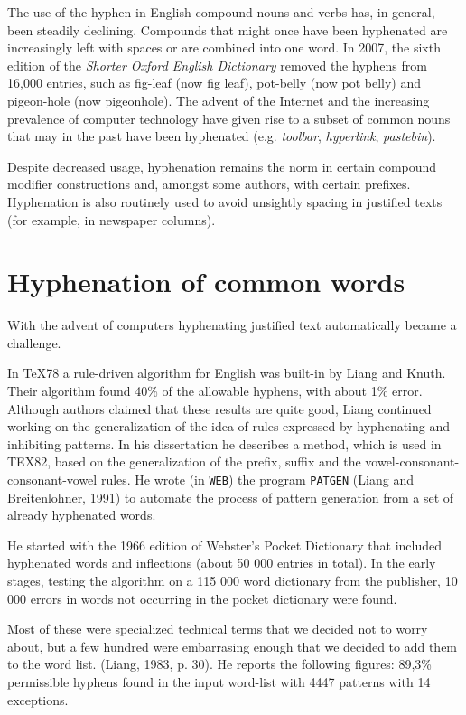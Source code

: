 The use of the hyphen in English compound nouns and verbs has, in general, been steadily declining. Compounds that might once have been hyphenated are increasingly left with spaces or are combined into one word. In 2007, the sixth edition of the \textit{Shorter Oxford English Dictionary} removed the hyphens from 16,000 entries, such as fig-leaf (now fig leaf), pot-belly (now pot belly) and pigeon-hole (now pigeonhole). The advent of the Internet and the increasing prevalence of computer technology have given rise to a subset of common nouns that may in the past have been hyphenated (e.g. \textit{toolbar}, \textit{hyperlink}, \textit{pastebin}).

Despite decreased usage, hyphenation remains the norm in certain compound modifier constructions and, amongst some authors, with certain prefixes. Hyphenation is also routinely used to avoid unsightly spacing in justified texts (for example, in newspaper columns). 

\section*{Hyphenation of common words}
With the advent of computers hyphenating justified text automatically became a challenge.


In \TeX78 a rule-driven algorithm for English   
was built-in by Liang and Knuth. Their algorithm
found 40\% of the allowable hyphens, with
about 1\% error. Although authors
claimed that these results are quite good, Liang
continued working on the generalization of the idea
of rules expressed by hyphenating and inhibiting
patterns. In his dissertation \citep{liang83} he describes
a method, which is used in TEX82, based
on the generalization of the prefix, suffix and the
vowel-consonant-consonant-vowel rules. He wrote
(in \texttt{WEB}) the program \texttt{PATGEN} (Liang and Breitenlohner,
1991) to automate the process of pattern 
generation from a set of already hyphenated words.

He started with the 1966 edition of Webster's Pocket\cite{websters1961}
Dictionary that included hyphenated words and inflections
 (about 50 000 entries in total). In the early
stages, testing the algorithm on a 115 000 word dictionary
from the publisher, 10 000 errors in words
not occurring in the pocket dictionary were found.

Most of these were specialized technical terms that
we decided not to worry about, but a few hundred
were embarrasing enough that we decided to add
them to the word list. (Liang, 1983, p. 30). He
reports the following figures: 89,3\% permissible hyphens
found in the input word-list with 4447 patterns
with 14 exceptions.

